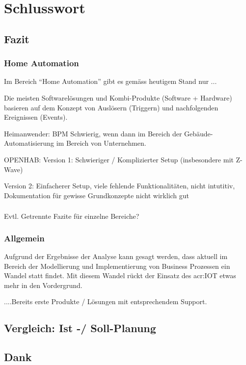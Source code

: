 
\chapter{Schlusswort} \label{chap:Finish}

\section{Fazit}
\subsection{Home Automation}
Im Bereich "`Home Automation"' gibt es gemäss heutigem Stand nur ...

Die meisten Softwarelösungen und Kombi-Produkte (Software + Hardware) basieren auf dem Konzept von Auslösern (Triggern) und nachfolgenden Ereignissen (Events).

Heimanwender: BPM Schwierig, wenn dann im Bereich der Gebäude-Automatisierung im Bereich von Unternehmen.


OPENHAB:
Version 1: Schwieriger / Komplizierter Setup (insbesondere mit Z-Wave)

Version 2: Einfacherer Setup, viele fehlende Funktionalitäten, nicht intutitiv, Dokumentation für gewisse Grundkonzepte nicht wirklich gut

\subsection{}
Evtl. Getrennte Fazite für einzelne Bereiche?


\subsection{Allgemein}
Aufgrund der Ergebnisse der Analyse kann gesagt werden, dass aktuell im Bereich der Modellierung und Implementierung von Business Prozessen ein Wandel statt findet. Mit diesem Wandel rückt der Einsatz des \gls{acr:IOT} etwas mehr in den Vordergrund. 

....Bereits erste Produkte / Lösungen mit entsprechendem Support.



\section{Vergleich: Ist -/ Soll-Planung}




\section{Dank}
